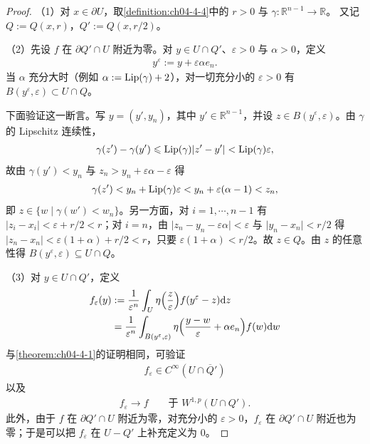 \documentclass[../../main.tex]{subfiles}%
\begin{document}
\begin{proof}
（1）对 $x\in\partial U$，取\cref{definition:ch04-4-4}中的 $r>0$ 与 $\gamma:\mathbb{R}^{n-1}\to\mathbb{R}$。%
又记 $Q:=Q(x,r)$，$Q':=Q(x,r/2)$。

（2）先设 $f$ 在 $\partial Q'\cap U$ 附近为零。对 $y\in U\cap Q'$、$\varepsilon>0$ 与 $\alpha>0$，定义
\begin{align*}
y^\varepsilon:=y+\varepsilon\alpha e_n.
\end{align*}
当 $\alpha$ 充分大时（例如 $\alpha:=\operatorname{Lip}(\gamma)+2$），对一切充分小的 $\varepsilon>0$ 有 $B(y^\varepsilon,\varepsilon)\subset U\cap Q$。

下面验证这一断言。写 $y=(y',y_n)$，其中 $y'\in\mathbb{R}^{n-1}$，并设 $z\in B(y^\varepsilon,\varepsilon)$。由 $\gamma$ 的 Lipschitz 连续性，
\begin{align*}
\gamma(z')-\gamma(y')\leqslant\operatorname{Lip}(\gamma)\lvert z'-y'\rvert<\operatorname{Lip}(\gamma)\varepsilon,
\end{align*}
故由 $\gamma(y')<y_n$ 与 $z_n>y_n+\varepsilon\alpha-\varepsilon$ 得
\begin{align*}
\gamma(z')<y_n+\operatorname{Lip}(\gamma)\varepsilon<y_n+\varepsilon(\alpha-1)<z_n,
\end{align*}
即 $z\in\{w\mid\gamma(w')<w_n\}$。另一方面，对 $i=1,\cdots,n-1$ 有 $\lvert z_i-x_i\rvert<\varepsilon+r/2<r$；对 $i=n$，由 $\lvert z_n-y_n-\varepsilon\alpha\rvert<\varepsilon$ 与 $\lvert y_n-x_n\rvert<r/2$ 得 $\lvert z_n-x_n\rvert<\varepsilon(1+\alpha)+r/2<r$，只要 $\varepsilon(1+\alpha)<r/2$。故 $z\in Q$。由 $z$ 的任意性得 $B(y^\varepsilon,\varepsilon)\subseteq U\cap Q$。

（3）对 $y\in U\cap Q'$，定义
\begin{align*}
f_\varepsilon(y)&:=\frac{1}{\varepsilon^n}\int_U\eta\Bigl(\frac{z}{\varepsilon}\Bigr)f(y^\varepsilon-z)\mathrm{d} z\\
&=\frac{1}{\varepsilon^n}\int_{B(y^\varepsilon,\varepsilon)}\eta\Bigl(\frac{y-w}{\varepsilon}+\alpha e_n\Bigr)f(w)\mathrm{d} w
\end{align*}
与\cref{theorem:ch04-4-1}的证明相同，可验证%
\begin{align*}
f_\varepsilon\in C^\infty(U\cap\overline{Q}')
\end{align*}
以及
\begin{align*}
f_\varepsilon\to f\qquad\text{于 }W^{1,p}(U\cap Q').
\end{align*}
此外，由于 $f$ 在 $\partial Q'\cap U$ 附近为零，对充分小的 $\varepsilon>0$，$f_\varepsilon$ 在 $\partial Q'\cap U$ 附近也为零；于是可以把 $f_\varepsilon$ 在 $U-Q'$ 上补充定义为 $0$。


\end{proof}
\end{document}
